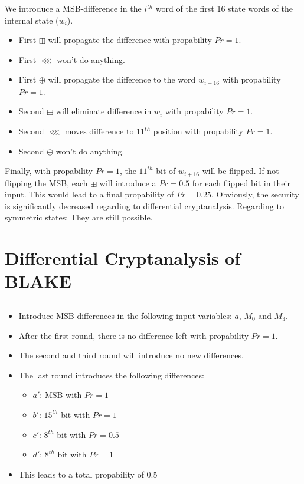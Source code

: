 We introduce a MSB-difference in the $i^{th}$ word of the first 16 state words of the internal state ($w_i$).

\begin{itemize}
    \item First $\boxplus$ will propagate the difference with propability $Pr = 1$.
    \item First $\lll$ won't do anything.
    \item First $\oplus$ will propagate the difference to the word $w_{i+16}$ with propability $Pr = 1$.
    \item Second $\boxplus$ will eliminate difference in $w_i$ with propability $Pr = 1$.
    \item Second $\lll$ moves difference to $11^{th}$ position with propability $Pr = 1$.
    \item Second $\oplus$ won't do anything.
\end{itemize}

Finally, with propability $Pr = 1$, the $11^{th}$ bit of $w_{i+16}$ will be flipped. If not flipping the MSB, each $\boxplus$ will introduce a $Pr = 0.5$ for each flipped bit in their input. This would lead to a final propability of $Pr = 0.25$. Obviously, the security is significantly decreased regarding to differential cryptanalysis. Regarding to symmetric states: They are still possible.


\section{Differential Cryptanalysis of BLAKE}

\subsection{}

\begin{itemize}
    \item Introduce MSB-differences in the following input variables: $a$, $M_0$ and $M_3$.
    \item After the first round, there is no difference left with propability $Pr = 1$.
    \item The second and third round will introduce no new differences.
    \item The last round introduces the following differences:
    \begin{itemize}
        \item $a'$: MSB with $Pr = 1$
        \item $b'$: $15^{th}$ bit with $Pr = 1$
        \item $c'$: $8^{th}$ bit with $Pr = 0.5$
        \item $d'$: $8^{th}$ bit with $Pr = 1$
    \end{itemize}
    \item This leads to a total propability of 0.5
\end{itemize}

